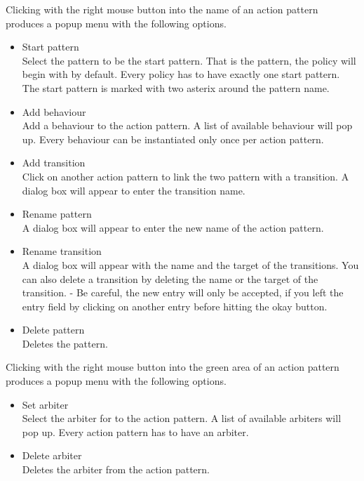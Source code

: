 Clicking with the right mouse button into the name of an action
pattern produces a popup menu with the following options.
\begin{itemize}
\item Start pattern \\
  Select the pattern to be the start pattern. That is the pattern, the
  policy will begin with by default. Every policy has to have exactly
  one start pattern. The start pattern is marked with two asterix
  around the pattern name.
\item Add behaviour \\
  Add a behaviour to the action pattern. A list of available behaviour
  will pop up. Every behaviour can be instantiated only once per
  action pattern.
\item Add transition \\
  Click on another action pattern to link the two pattern with a
  transition. A dialog box will appear to enter the transition name.
\item Rename pattern \\
  A dialog box will appear to enter the new name of the action
  pattern.
\item Rename transition \\
  A dialog box will appear with the name and the target of the
  transitions. You can also delete a transition by deleting the name
  or the target of the transition. - Be careful, the new entry
  will only be accepted, if you left the entry field by clicking on
  another entry before hitting the okay button.
\item Delete pattern \\
  Deletes the pattern.
\end{itemize}

Clicking with the right mouse button into the green area of an action
pattern produces a popup menu with the following options.
\begin{itemize}
\item Set arbiter \\
  Select the arbiter for to the action pattern. A list of available arbiters
  will pop up. Every action pattern has to have an arbiter.
\item Delete arbiter \\
  Deletes the arbiter from the action pattern.
\end{itemize}

